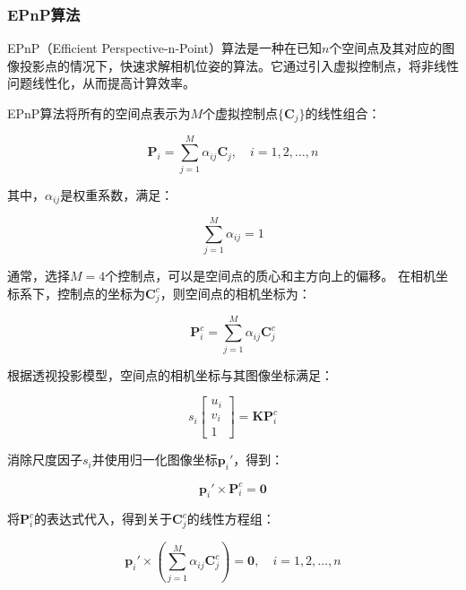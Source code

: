 \subsubsection{EPnP算法}

EPnP（Efficient Perspective-n-Point）算法\cite{EPnP}是一种在已知$n$个空间点及其对应的图像投影点的情况下，快速求解相机位姿的算法。它通过引入虚拟控制点，将非线性问题线性化，从而提高计算效率。

EPnP算法将所有的空间点表示为$M$个虚拟控制点$\{\mathbf{C}_j\}$的线性组合：

\begin{equation}
	\mathbf{P}_i = \sum_{j=1}^{M} \alpha_{ij} \mathbf{C}_j, \quad i = 1,2,\dots,n
\end{equation}

其中，$\alpha_{ij}$是权重系数，满足：

\begin{equation}
	\sum_{j=1}^{M} \alpha_{ij} = 1
\end{equation}

通常，选择$M=4$个控制点，可以是空间点的质心和主方向上的偏移。
在相机坐标系下，控制点的坐标为$\mathbf{C}_j^{c}$，则空间点的相机坐标为：

\begin{equation}
	\mathbf{P}_i^{c} = \sum_{j=1}^{M} \alpha_{ij} \mathbf{C}_j^{c}
\end{equation}

根据透视投影模型，空间点的相机坐标与其图像坐标满足：

\begin{equation}
	s_i \begin{bmatrix}
		u_i \\ v_i \\ 1
	\end{bmatrix} = \mathbf{K} \mathbf{P}_i^{c}
\end{equation}


消除尺度因子$s_i$并使用归一化图像坐标$\mathbf{p}_i'$，得到：

\begin{equation}
	\mathbf{p}_i' \times \mathbf{P}_i^{c} = \mathbf{0}
\end{equation}

将$\mathbf{P}_i^{c}$的表达式代入，得到关于$\mathbf{C}_j^{c}$的线性方程组：

\begin{equation}
	\mathbf{p}_i' \times \left( \sum_{j=1}^{M} \alpha_{ij} \mathbf{C}_j^{c} \right ) = \mathbf{0}, \quad i = 1,2,\dots,n
\end{equation}

